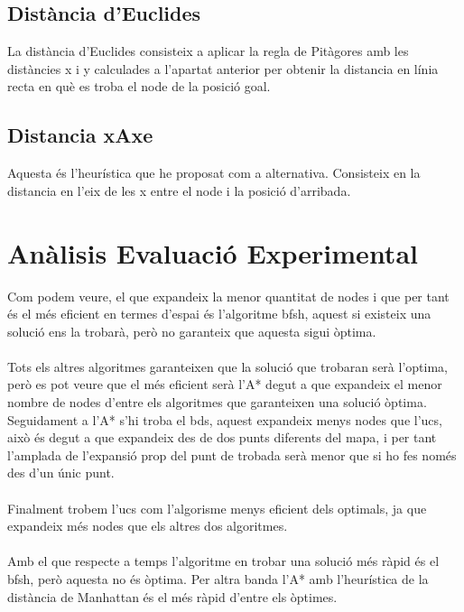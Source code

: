 \documentclass{article}
\begin{document}
\subsection{Distància d'Euclides}
La distància d'Euclides consisteix a aplicar la regla de Pitàgores amb les distàncies x i y calculades a l'apartat anterior per obtenir la distancia en línia recta en què es troba el node de la posició goal.
\subsection{Distancia xAxe}
Aquesta és l'heurística que he proposat com a alternativa. Consisteix en la distancia en l'eix de les x entre el node i la posició d'arribada.

\section{Anàlisis Evaluació Experimental}
Com podem veure, el que expandeix la menor quantitat de nodes i que per tant és el més eficient en termes d'espai és l'algoritme bfsh, aquest si existeix una solució ens la trobarà, però no garanteix que aquesta sigui òptima.
\\\\
Tots els altres algoritmes garanteixen que la solució que trobaran serà l'optima, però es pot veure que el més eficient serà l'A* degut a que expandeix el menor nombre de nodes d'entre els algoritmes que garanteixen una solució òptima.\\
Seguidament a l'A* s'hi troba el bds, aquest expandeix menys nodes que l'ucs, això és degut a que expandeix des de dos punts diferents del mapa, i per tant l'amplada de l'expansió prop del punt de trobada serà menor que si ho fes només des d'un únic punt.
\\\\
Finalment trobem l'ucs com l'algorisme menys eficient dels optimals, ja que expandeix més nodes que els altres dos algoritmes.
\\\\
Amb el que respecte a temps l'algoritme en trobar una solució més ràpid és el bfsh, però aquesta no és òptima. Per altra banda l'A* amb l'heurística de la distància de Manhattan és el més ràpid d'entre els òptimes.
\end{document}
